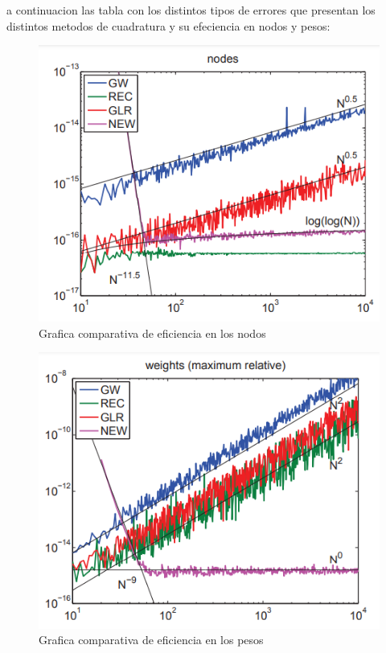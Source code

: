 \documentclass[journal,transmag]{IEEEtran}
\theoremstyle{mytheoremstyle}
\theoremstyle{mytheoremstyle}
\theoremstyle{myproblemstyle}
\begin{document}
            \vspace{2mm}
            
            a continuacion las tabla con los distintos tipos de errores que presentan los distintos metodos de cuadratura y su efeciencia en nodos y pesos: 
            
            \vspace{2.6cm}
            
            \begin{figure}[h]
                \centering
                \includegraphics[width=\linewidth]{images/eficiencia_metodos_nodos.PNG}
                \caption{Grafica comparativa de eficiencia en los nodos}
                \label{fig:Eficiencia en los nodos}
            \end{figure}
            
            \begin{figure}[h]
                \centering
                \includegraphics[width=\linewidth]{images/eficiencia_metodos_pesos.PNG}
                \caption{Grafica comparativa de eficiencia en los pesos}
                \label{fig:Eficiencia en los pesos}
            \end{figure}
            
\end{document}

